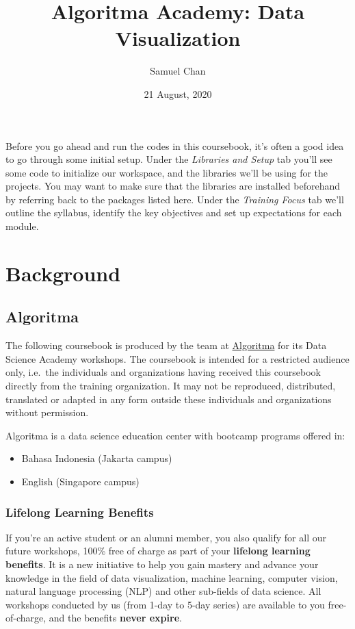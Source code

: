 \documentclass[]{article}
\title{Algoritma Academy: Data Visualization}
\author{Samuel Chan}
\date{21 August, 2020}
\providecommand{\tightlist}{%
  \setlength{\itemsep}{0pt}\setlength{\parskip}{0pt}}
\begin{document}
\maketitle

Before you go ahead and run the codes in this coursebook, it's often a
good idea to go through some initial setup. Under the \emph{Libraries
and Setup} tab you'll see some code to initialize our workspace, and the
libraries we'll be using for the projects. You may want to make sure
that the libraries are installed beforehand by referring back to the
packages listed here. Under the \emph{Training Focus} tab we'll outline
the syllabus, identify the key objectives and set up expectations for
each module.

\hypertarget{background}{%
\section{Background}\label{background}}

\hypertarget{algoritma}{%
\subsection{Algoritma}\label{algoritma}}

The following coursebook is produced by the team at
\href{https://algorit.ma}{Algoritma} for its Data Science Academy
workshops. The coursebook is intended for a restricted audience only,
i.e.~the individuals and organizations having received this coursebook
directly from the training organization. It may not be reproduced,
distributed, translated or adapted in any form outside these individuals
and organizations without permission.

Algoritma is a data science education center with bootcamp programs
offered in:

\begin{itemize}
\tightlist
\item
  Bahasa Indonesia (Jakarta campus)\\
\item
  English (Singapore campus)
\end{itemize}

\hypertarget{lifelong-learning-benefits}{%
\subsubsection{Lifelong Learning
Benefits}\label{lifelong-learning-benefits}}

If you're an active student or an alumni member, you also qualify for
all our future workshops, 100\% free of charge as part of your
\textbf{lifelong learning benefits}. It is a new initiative to help you
gain mastery and advance your knowledge in the field of data
visualization, machine learning, computer vision, natural language
processing (NLP) and other sub-fields of data science. All workshops
conducted by us (from 1-day to 5-day series) are available to you
free-of-charge, and the benefits \textbf{never expire}.
\end{document}
